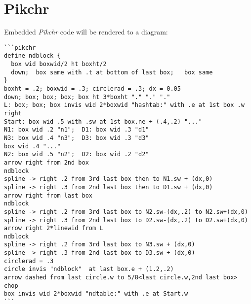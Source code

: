\documentclass{tufte-handout}
\begin{document}
\section{Pikchr}\label{sec:3}
Embedded \textit{Pikchr} code will be rendered to a diagram:\begin{verbatim}
```pikchr
define ndblock {
  box wid boxwid/2 ht boxht/2
  down;  box same with .t at bottom of last box;   box same
}
boxht = .2; boxwid = .3; circlerad = .3; dx = 0.05
down; box; box; box; box ht 3*boxht "." "." "."
L: box; box; box invis wid 2*boxwid "hashtab:" with .e at 1st box .w
right
Start: box wid .5 with .sw at 1st box.ne + (.4,.2) "..."
N1: box wid .2 "n1";  D1: box wid .3 "d1"
N3: box wid .4 "n3";  D3: box wid .3 "d3"
box wid .4 "..."
N2: box wid .5 "n2";  D2: box wid .2 "d2"
arrow right from 2nd box
ndblock
spline -> right .2 from 3rd last box then to N1.sw + (dx,0)
spline -> right .3 from 2nd last box then to D1.sw + (dx,0)
arrow right from last box
ndblock
spline -> right .2 from 3rd last box to N2.sw-(dx,.2) to N2.sw+(dx,0)
spline -> right .3 from 2nd last box to D2.sw-(dx,.2) to D2.sw+(dx,0)
arrow right 2*linewid from L
ndblock
spline -> right .2 from 3rd last box to N3.sw + (dx,0)
spline -> right .3 from 2nd last box to D3.sw + (dx,0)
circlerad = .3
circle invis "ndblock"  at last box.e + (1.2,.2)
arrow dashed from last circle.w to 5/8<last circle.w,2nd last box> chop
box invis wid 2*boxwid "ndtable:" with .e at Start.w
```

\end{verbatim}
\begin{figure}
\fontsize{8pt}{10pt}\selectfont  
\end{figure}
\end{document}
